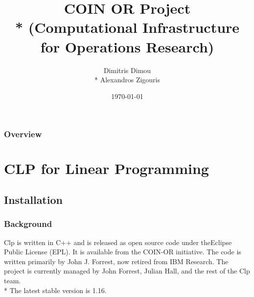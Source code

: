 \documentclass{beamer}
\title[COIN OR]{COIN OR Project \\* (Computational Infrastructure for Operations Research)} %
\author{Dimitris Dimou \\* Alexandros Zigouris} %
\institute[UP] %
{
University of Patras \\ %
\medskip
\textit{mijuomij@gmail.com} %
}
\date{\today} %
\begin{document}
\begin{frame}
\titlepage %
\end{frame}

\begin{frame}
\frametitle{Overview} %
\tableofcontents %
\end{frame}


\section{CLP for Linear Programming} %


\subsection{Installation} %

\begin{frame}
\frametitle{Background}
Clp is written in C++ and is released as open source code under the ​Eclipse Public License (EPL). It is available from the ​COIN-OR initiative. The code is written primarily by John J. Forrest, now retired from IBM Research. The project is currently managed by John Forrest, ​Julian Hall, and the rest of the ​Clp team. \\*
The latest stable version is 1.16.
\end{frame}
\end{document}
